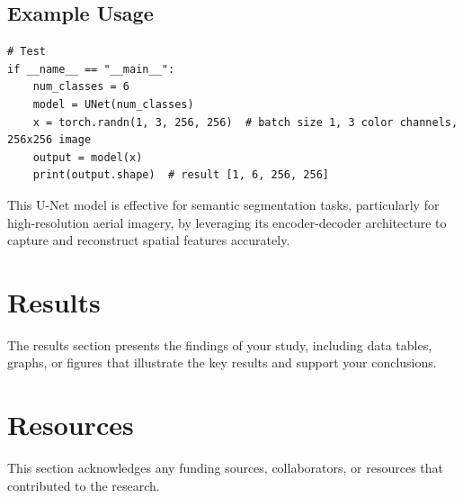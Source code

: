 \documentclass{article}
\begin{document}
\subsection{Example Usage}

\begin{verbatim}
# Test
if __name__ == "__main__":
    num_classes = 6
    model = UNet(num_classes)
    x = torch.randn(1, 3, 256, 256)  # batch size 1, 3 color channels, 256x256 image
    output = model(x)
    print(output.shape)  # result [1, 6, 256, 256]
\end{verbatim}

This U-Net model is effective for semantic segmentation tasks, particularly for high-resolution aerial imagery, by leveraging its encoder-decoder architecture to capture and reconstruct spatial features accurately.

\section{Results}
\lipsum[5]
The results section presents the findings of your study, including data tables, graphs, or figures that illustrate the key results and support your conclusions.

\section{Resources}
\lipsum[6]
This section acknowledges any funding sources, collaborators, or resources that contributed to the research.
\end{document}
